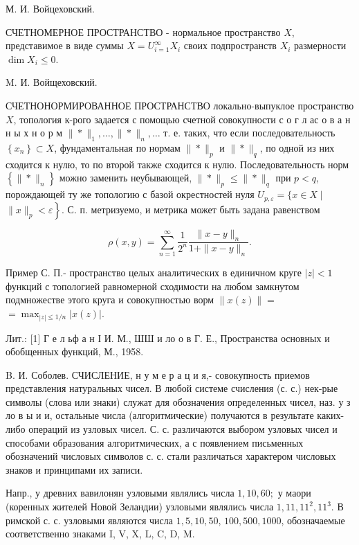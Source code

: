 \documentclass[10pt]{article}
\begin{document}
М. И. Войцеховский.



СЧЕТНОМЕРНОЕ ПРОСТРАНСТВО - нормальное пространство $X$, представимое в виде суммы $X=U_{i=1}^{\infty} X_{i}$ своих подпространств $X_{i}$ размерности $\operatorname{dim} X_{i} \leqslant 0$.



M. И. Войщеховский.



СЧЕТНОНОРМИРОВАННОЕ ПРОСТРАНСТВО локально-выпуклое пространство $X$, топология к-рого задается с помощью счетной совокупности с о г л ас о в а н н ы х н о р м $\|*\|_{1}, \ldots,\|*\|_{n}, \ldots$ т. е. таких, что если последовательность $\left\{x_{n}\right\} \subset X$, фундаментальная по нормам $\|*\|_{p}$ и $\|*\|_{q}$, по одной из них сходится к нулю, то по второй также сходится к нулю. Последовательность норм $\left\{\|*\|_{n}\right\}$ можно заменить неубывающей, $\|*\|_{p} \leqslant\|*\|_{q}$ при $p<q$, порождающей ту же топологию с базой окрестностей нуля $U_{p, \varepsilon}=\{x \in X \mid$ $\left.\|x\|_{p}<\varepsilon\right\}$. С. п. метризуемо, и метрика может быть задана равенством



\[

\rho(x, y)=\sum_{n=1}^{\infty} \frac{1}{2^{n}} \frac{\|x-y\|_{n}}{1+\|x-y\|_{n}} .

\]



Пример С. П.- пространство целых аналитических в единичном круге $|z|<1$ функций с топологией равномерной сходимости на любом замкнутом подмножестве этого круга и совокупностью ворм $\|x(z)\|=$ $=\max _{|z| \leqslant 1 / n}|x(z)|$.



Лит.: [1] Г е л ьф а н І И. М., ШШ и ло о в Г. Е., Пространства основных и обобщенных функций, М., 1958.



B. И. Соболев. СЧИСЛЕНИЕ, н у м е р а ц и я,- совокупность приемов представления натуральных чисел. В любой системе счисления (с. с.) нек-рые символы (слова или знаки) служат для обозначения определенных чисел, наз. у з ло в ы и и, остальные числа (алгоритмические) получаются в результате каких-либо операций из узловых чисел. С. с. различаются выбором узловых чисел и способами образования алгоритмических, а с появлением письменных обозначений числовых символов с. с. стали различаться характером числовых знаков и принципами их записи.



Напр., у древних вавилонян узловыми являлись числа $1,10,60 ;$ у маори (коренных жителей Новой Зеландии) узловыми являлись числа $1,11,11^{2}, 11^{3}$. В римской с. с. узловыми являются числа $1,5,10,50$, $100,500,1000$, обозначаемые соответственно знаками I, V, X, L, C, D, M.
\end{document}

